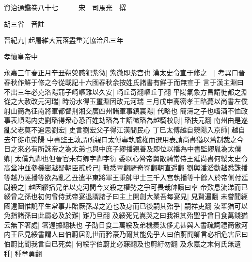 






























































資治通鑑卷八十七　　　宋　司馬光　撰

胡三省　音註

晉紀九|{
	起屠維大荒落盡重光協洽凡三年}


孝懷皇帝中

永嘉三年春正月辛丑朔熒惑犯紫微|{
	紫微即紫宫也}
漢太史令宣于修之　|{
	考異曰晉春秋作鮮于修之今從載記十六國春秋余按姓氏諸書有鮮于而無宣于}
言于漢主淵曰不出三年必克洛陽蒲子崎嶇難以久安|{
	崎丘奇翻嶇丘于翻}
平陽氣象方昌請徙都之淵從之大赦改元河瑞|{
	時汾水得玉璽淵因改元河瑞}
三月戊申高密孝王略薨以尚書左僕射山簡為征南將軍都督荆湘交廣四州諸軍事鎮襄陽|{
	代略也}
簡濤之子也嗜酒不恤政事表順陽内史劉璠得衆心恐百姓劫璠為主詔徵璠為越騎校尉|{
	璠扶元翻}
南州由是遂亂父老莫不追思劉宏|{
	史言劉宏父子得江漢間民心}
丁巳太傅越自滎陽入京師|{
	越自去年徙屯滎陽}
中書監王敦謂所親曰太傅專執威權而選用表請尚書猶以舊制裁之今日之來必有所誅帝之為太弟也與中庶子繆播親善及即位以播為中書監繆胤為太僕卿|{
	太僕九卿也但晉官未有卿字卿字衍}
委以心膂帝舅散騎常侍王延尚書何綏太史令高堂冲並參機密越疑朝臣貳於己|{
	散悉亶翻騎奇寄翻朝直遥翻}
劉輿潘滔勸越悉誅播等越乃誣播等欲為亂乙丑遣平東將軍王秉帥甲士三千入宫執播等十餘人於帝側付廷尉殺之|{
	越因繆播兄弟以克河間今又殺之權勢之爭可畏哉帥讀曰率}
帝歎息流涕而已綏曾之孫也初何曾侍武帝宴退謂諸子曰主上開創大業吾每宴見|{
	見賢遍翻}
未嘗聞經國遠圖惟說平生常事非貽厥孫謀之道也及身而已後嗣其殆乎|{
	嗣祥吏翻}
汝輩猶可以免指諸孫曰此屬必及於難|{
	難乃旦翻}
及綏死兄嵩哭之曰我祖其殆聖乎曾日食萬錢猶云無下箸處|{
	箸遟據翻梜也}
子劭日食二萬綏及弟機羨汰侈尤甚與人書疏詞禮簡傲河内王尼見綏書謂人曰伯蔚居亂世而矜豪乃爾其能免乎人曰伯蔚聞卿言必相危害尼曰伯蔚比聞我言自已死矣|{
	何綏字伯蔚比必寐翻及也蔚紆勿翻}
及永嘉之末何氏無遺種|{
	種章勇翻}


